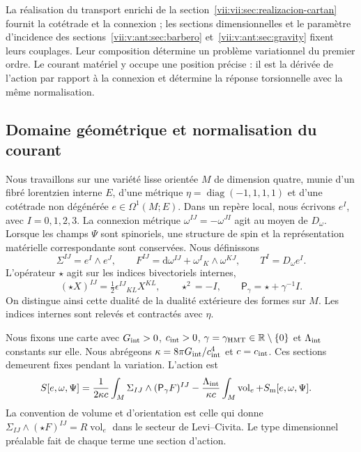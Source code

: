 La réalisation du transport enrichi de la
section~\ref{vii:vii:sec:realizacion-cartan} fournit la cotétrade et la
connexion ; les sections dimensionnelles et le paramètre d'incidence des
sections~\ref{vii:v:ant:sec:barbero} et~\ref{vii:v:ant:sec:gravity} fixent leurs couplages. Leur composition
détermine un problème variationnel du premier ordre. Le courant matériel
y occupe une position précise : il est la dérivée de l'action par rapport à
la connexion et détermine la réponse torsionnelle avec la même normalisation.

\subsection{Domaine géométrique et normalisation du courant}
\label{vii:vii:subsec:dominio-corriente-cartan}

Nous travaillons sur une variété lisse orientée \(M\) de dimension quatre, munie d'un fibré lorentzien interne \(E\), d'une métrique \(\eta=\operatorname{diag}(-1,1,1,1)\) et d'une cotétrade non dégénérée \(e\in\Omega^1(M;E)\). Dans un repère local, nous écrivons \(e^I\), avec \(I=0,1,2,3\). La connexion métrique \(\omega^{IJ}=-\omega^{JI}\) agit au moyen de \(D_\omega\). Lorsque les champs \(\Psi\) sont spinoriels, une structure de spin et la représentation matérielle correspondante sont conservées. Nous définissons
\begin{equation}
 \Sigma^{IJ}=e^I\wedge e^J,\qquad
 F^{IJ}=\mathrm d\omega^{IJ}+\omega^I{}_{K}\wedge\omega^{KJ},
 \qquad T^I=D_\omega e^I.
 \label{vii:vii:eq:campos-cartan}
\end{equation}
L'opérateur \(\star\) agit sur les indices bivectoriels internes,
\begin{equation}
 (\star X)^{IJ}=\tfrac12\epsilon^{IJ}{}_{KL}X^{KL},
 \qquad \star^2=-I,\qquad
 \mathsf P_\gamma=\star+\gamma^{-1}I.
 \label{vii:vii:eq:operador-holst}
\end{equation}
On distingue ainsi cette dualité de la dualité extérieure des formes sur
\(M\). Les indices internes sont relevés et contractés avec \(\eta\).

Nous fixons une carte avec \(G_{\rm int}>0\), \(c_{\rm int}>0\),
\(\gamma=\gamma_{\rm HMT}\in\mathbb R\setminus\{0\}\) et
\(\Lambda_{\rm int}\) constants sur elle. Nous abrégeons
\(\kappa=8\pi G_{\rm int}/c_{\rm int}^4\) et \(c=c_{\rm int}\).
Ces sections demeurent fixes pendant la variation. L’action est
\begin{equation}
 \begin{split}
 S[e,\omega,\Psi]={}&
 \frac1{2\kappa c}\int_M\Sigma_{IJ}\wedge
                         (\mathsf P_\gamma F)^{IJ}
 -\frac{\Lambda_{\rm int}}{\kappa c}
                         \int_M\operatorname{vol}_e
 +S_{\rm m}[e,\omega,\Psi].
 \end{split}
 \label{vii:vii:eq:accion-cartan-holst}
\end{equation}
La convention de volume et d'orientation est celle qui donne
\(\Sigma_{IJ}\wedge(\star F)^{IJ}=R\operatorname{vol}_e\)
dans le secteur de Levi--Civita. Le type dimensionnel préalable fait de chaque
terme une section d'action.

